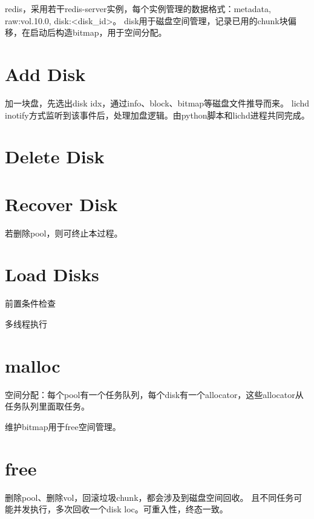 redis，采用若干redis-server实例，每个实例管理的数据格式：metadata, raw:vol.10.0, disk:<disk_id>。
disk用于磁盘空间管理，记录已用的chunk块偏移，在启动后构造bitmap，用于空间分配。

\section{Add Disk}

加一块盘，先选出disk idx，通过info、block、bitmap等磁盘文件推导而来。
lichd inotify方式监听到该事件后，处理加盘逻辑。由python脚本和lichd进程共同完成。

\section{Delete Disk}

\section{Recover Disk}

若删除pool，则可终止本过程。

\section{Load Disks}

前置条件检查

多线程执行

\section{malloc}

空间分配：每个pool有一个任务队列，每个disk有一个allocator，这些allocator从任务队列里面取任务。

维护bitmap用于free空间管理。

\section{free}

删除pool、删除vol，回滚垃圾chunk，都会涉及到磁盘空间回收。
且不同任务可能并发执行，多次回收一个disk loc。可重入性，终态一致。
